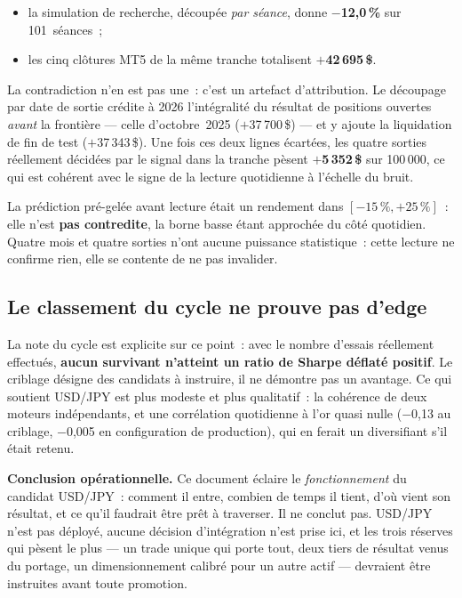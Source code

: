 \begin{itemize}[leftmargin=1.4em, itemsep=0.3em]
\item la simulation de recherche, découpée \emph{par séance}, donne
      \textbf{$-$12,0\,\%} sur 101~séances~;
\item les cinq clôtures MT5 de la même tranche totalisent
      \textbf{$+$42\,695\,\$}.
\end{itemize}

La contradiction n'en est pas une~: c'est un artefact d'attribution. Le
découpage par date de sortie crédite à 2026 l'intégralité du résultat de
positions ouvertes \emph{avant} la frontière --- celle d'octobre~2025
($+$37\,700\,\$) --- et y ajoute la liquidation de fin de test
($+$37\,343\,\$). Une fois ces deux lignes écartées, les quatre sorties
réellement décidées par le signal dans la tranche pèsent \textbf{$+$5\,352\,\$}
sur 100\,000, ce qui est cohérent avec le signe de la lecture quotidienne à
l'échelle du bruit.

La prédiction pré-gelée avant lecture était un rendement dans
$[-15\,\%, +25\,\%]$~: elle n'est \textbf{pas contredite}, la borne basse étant
approchée du côté quotidien. Quatre mois et quatre sorties n'ont aucune
puissance statistique~: cette lecture ne confirme rien, elle se contente de ne
pas invalider.

\subsection*{Le classement du cycle ne prouve pas d'edge}

La note du cycle est explicite sur ce point~: avec le nombre d'essais
réellement effectués, \textbf{aucun survivant n'atteint un ratio de Sharpe
déflaté positif}. Le criblage désigne des candidats à instruire, il ne
démontre pas un avantage. Ce qui soutient USD/JPY est plus modeste et plus
qualitatif~: la cohérence de deux moteurs indépendants, et une corrélation
quotidienne à l'or quasi nulle ($-$0,13 au criblage, $-$0,005 en configuration
de production), qui en ferait un diversifiant s'il était retenu.

\begin{warningbox}
\textbf{Conclusion opérationnelle.} Ce document éclaire le \emph{fonctionnement}
du candidat USD/JPY~: comment il entre, combien de temps il tient, d'où vient
son résultat, et ce qu'il faudrait être prêt à traverser. Il ne conclut pas.
USD/JPY n'est pas déployé, aucune décision d'intégration n'est prise ici, et
les trois réserves qui pèsent le plus --- un trade unique qui porte tout, deux
tiers de résultat venus du portage, un dimensionnement calibré pour un autre
actif --- devraient être instruites avant toute promotion.
\end{warningbox}
